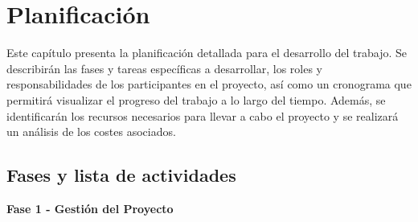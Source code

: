 \documentclass[a4paper, 10pt]{article}
\begin{document}
\clearpage

\section{Planificación}
Este capítulo presenta la planificación detallada para el desarrollo del trabajo. Se describirán las fases y tareas específicas a desarrollar, los roles y responsabilidades de los participantes en el proyecto, así como un cronograma que permitirá visualizar el progreso del trabajo a lo largo del tiempo. Además, se identificarán los recursos necesarios para llevar a cabo el proyecto y se realizará un análisis de los costes asociados.

\subsection{Fases y lista de actividades}
\par\vspace{0.5cm}
\textbf{\large Fase 1 - Gestión del Proyecto} \vspace{0.5cm}
\end{document}
